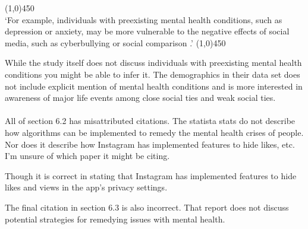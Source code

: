 \documentclass[12pt]{article}
\begin{document}
\begin{center}
    \line(1,0){450}\\
    `For example, individuals with preexisting mental health conditions, such as depression or anxiety, may be more vulnerable to the negative effects of social media, such as cyberbullying or social comparison \cite{hampton2014}.'
    \line(1,0){450}
\end{center}
While the study itself does not discuss individuals with preexisting mental health conditions you might be able to infer it. The demographics in their data set does not include explicit mention of mental health conditions and is more interested in awareness of major life events among close social ties and weak social ties.  
\\\\

All of section 6.2 has misattributed citations. The statista stats do not describe how algorithms can be implemented to remedy the mental health crises of people. Nor does it describe how Instagram has implemented features to hide likes, etc. I'm unsure of which paper it might be citing.

Though it is correct in stating that Instagram has implemented features to hide likes and views in the app's privacy settings.

The final citation in section 6.3 is also incorrect. That report does not discuss potential strategies for remedying issues with mental health. 
\end{document}
